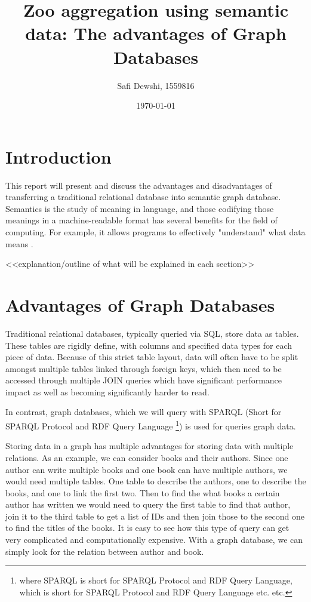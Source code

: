 \documentclass[a4paper]{article}
\author{Safi Dewshi, 1559816}
\title{Zoo aggregation using semantic data: The advantages of Graph Databases}
\date{\today}
\begin{document}
\pagestyle{fancy}
\lhead{}
\maketitle
\pagebreak
\tableofcontents
\pagebreak


\section{Introduction}
This report will present and discuss the advantages and disadvantages  of transferring a traditional relational database into semantic graph database. 
Semantics is the study of meaning in language, and those codifying those meanings in a machine-readable format has several benefits for the field of computing. For example, it allows programs to effectively "understand" what data means \autocite{Szeredi2014}.




<<explanation/outline of what will be explained in each section>>



\section{Advantages of Graph Databases}

Traditional relational databases, typically queried via SQL, store data as tables. These tables are rigidly define, with columns and specified data types for each piece of data. Because of this strict table layout, data will often have to be split amongst multiple tables linked through foreign keys, which then need to be accessed through multiple JOIN queries which have significant performance impact as well as becoming significantly harder to read.

In contrast, graph databases, which we will query with SPARQL (Short for SPARQL Protocol and RDF Query Language \footnote{where SPARQL is short for SPARQL Protocol and RDF Query Language, which is short for SPARQL Protocol and RDF Query Language etc. etc.}) is used for queries graph data.

Storing data in a graph has multiple advantages for storing data with multiple relations. As an example, we can consider books and their authors. Since one author can write multiple books and one book can have multiple authors, we would need multiple tables. One table to describe the authors, one to describe the books, and one to link the first two. Then to find the what books a certain author has written we would need to query the first table to find that author, join it to the third table to get a list of IDs and then join those to the second one to find the titles of the books. It is easy to see how this type of query can get very complicated and computationally expensive. With a graph database, we can simply look for the relation between author and book.
\end{document}
